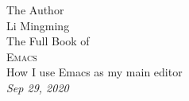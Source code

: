 \begin{titlepage}
  \raggedleft
      {\Large The Author\\ Li Mingming\\[1in] }
  {\large The Full Book of\\}
  {\Huge\scshape Emacs\\[.2in]}
  {\large How I use Emacs as my main editor\\}
  \vfill
  {\itshape Sep 29, 2020}
\end{titlepage}

